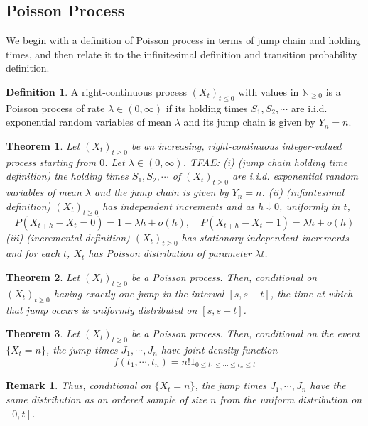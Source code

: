\documentclass{article}
\newtheorem{Thm}{Theorem}[section]
\newtheorem*{Rk}{Remark}
\theoremstyle{definition}
\newtheorem{Def}{Definition}[section]
\begin{document}
\subsection{Poisson Process}

We begin with a definition of Poisson process in terms of jump chain and holding times, and then relate it to
the infinitesimal definition and transition probability definition.
\begin{Def}
    A right-continuous process $(X_t)_{t\le 0}$ with values in $\mathbb{N}_{\ge 0}$ is a Poisson process of rate $\lambda\in (0,\infty)$
    if its holding times $S_1,S_2,\cdots$ are i.i.d. exponential random variables of mean $\lambda$ and its jump chain is given by $Y_n=n$.
\end{Def}

\begin{Thm}
    Let $(X_t)_{t\ge 0}$ be an increasing, right-continuous integer-valued process starting from $0$. Let $\lambda\in(0,\infty)$. TFAE:\newline 
    (i) (jump chain holding time definition) the holding times $S_1,S_2,\cdots$ of $(X_t)_{t\ge 0}$ are i.i.d. exponential random variables of mean $\lambda$ 
    and the jump chain is given by $Y_n=n$.\newline 
    (ii) (infinitesimal definition) $(X_t)_{t\ge 0}$ has independent increments and as $h\downarrow 0$, uniformly in $t$,
    \[P(X_{t+h}-X_t=0)=1-\lambda h+o(h),\quad P(X_{t+h}-X_t=1)=\lambda h+o(h)\]\newline 
    (iii) (incremental definition) $(X_t)_{t\ge 0}$ has stationary independent increments and for each $t$, $X_t$ has Poisson distribution of parameter $\lambda t$.
\end{Thm}

\begin{Thm}
    Let $(X_t)_{t\ge 0}$ be a Poisson process. Then, conditional on $(X_t)_{t\ge 0}$ having exactly one jump in the interval $[s, s +t]$, the time at which that jump occurs is uniformly distributed on $[s, s + t]$.
\end{Thm}
\begin{Thm}
    Let $(X_t)_{t\ge 0}$ be a Poisson process. Then, conditional on the event $\{X_t = n\}$, the jump times $J_1, \cdots ,J_n$ have joint density function
\[f(t_1,\cdots ,t_n)=n!1_{0\le t_1\le \cdots \le t_n\le t}\]
\end{Thm}
\begin{Rk}
    Thus, conditional on $\{X_t = n\}$, the jump times $J_1, \cdots ,J_n$ have the same distribution as an ordered sample of size $n$ from the uniform distribution on $[0,t]$.
\end{Rk}
\end{document}
